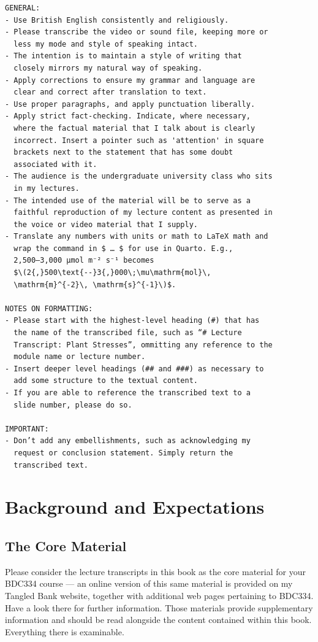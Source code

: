 \documentclass[
  12pt,
]{book}
\begin{document}
\begin{verbatim}
GENERAL:
- Use British English consistently and religiously.
- Please transcribe the video or sound file, keeping more or
  less my mode and style of speaking intact. 
- The intention is to maintain a style of writing that
  closely mirrors my natural way of speaking.
- Apply corrections to ensure my grammar and language are
  clear and correct after translation to text. 
- Use proper paragraphs, and apply punctuation liberally.
- Apply strict fact-checking. Indicate, where necessary,
  where the factual material that I talk about is clearly
  incorrect. Insert a pointer such as 'attention' in square
  brackets next to the statement that has some doubt
  associated with it.
- The audience is the undergraduate university class who sits
  in my lectures. 
- The intended use of the material will be to serve as a
  faithful reproduction of my lecture content as presented in
  the voice or video material that I supply.
- Translate any numbers with units or math to LaTeX math and
  wrap the command in $ … $ for use in Quarto. E.g.,
  2,500–3,000 μmol m⁻² s⁻¹ becomes
  $\(2{,}500\text{--}3{,}000\;\mu\mathrm{mol}\,
  \mathrm{m}^{-2}\, \mathrm{s}^{-1}\)$.

NOTES ON FORMATTING:
- Please start with the highest-level heading (#) that has
  the name of the transcribed file, such as “# Lecture
  Transcript: Plant Stresses”, ommitting any reference to the
  module name or lecture number.
- Insert deeper level headings (## and ###) as necessary to
  add some structure to the textual content. 
- If you are able to reference the transcribed text to a
  slide number, please do so.
 
IMPORTANT:
- Don’t add any embellishments, such as acknowledging my
  request or conclusion statement. Simply return the
  transcribed text.
\end{verbatim}

\chapter{Background and Expectations}\label{background-and-expectations}

\section{The Core Material}\label{the-core-material}

Please consider the lecture transcripts in this book as the core
material for your BDC334 course --- an online version of this same
material is provided on my Tangled Bank website, together with
additional web pages pertaining to BDC334. Have a look there for further
information. Those materials provide supplementary information and
should be read alongside the content contained within this book.
Everything there is examinable.
\end{document}
